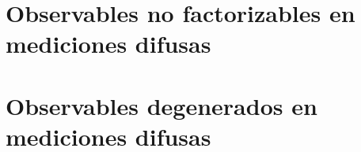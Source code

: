 \section{Observables no factorizables en mediciones difusas}
\section{Observables degenerados en mediciones difusas}
